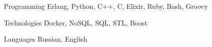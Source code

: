 

\begin{cvskills}

  \cvskill
    {Programming} %
    {Erlang, Python, C++, C, Elixir, Ruby, Bash, Groovy} %

  \cvskill
    {Technologies} %
    {Docker, NoSQL, SQL, STL, Boost} %

  \cvskill
    {Languages} %
    {Russian, English} %

\end{cvskills}
